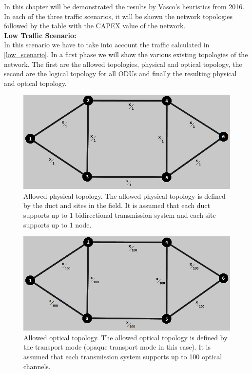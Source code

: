 In this chapter will be demonstrated the results by Vasco's heuristics from 2016. In each of the three traffic scenarios, it will be shown the network topologies followed by the table with the CAPEX value of the network.\\

\textbf{Low Traffic Scenario:}\\

In this scenario we have to take into account the traffic calculated in \ref{low_scenario}. In a first phase we will show the various existing topologies of the network. The first are the allowed topologies, physical and optical topology, the second are the logical topology for all ODUs and finally the resulting physical and optical topology.\\

\begin{figure}[H]
\centering
\includegraphics[width=13cm]{sdf/heuristic/opaque_protection/low/allowed_physical_low}
\caption{Allowed physical topology. The allowed physical topology is defined by the duct and sites in the field. It is assumed that each duct supports up to 1 bidirectional transmission system and each site supports up to 1 node.}
\label{allowed_physical_protec_ref_low_heuristic}
\end{figure}

\begin{figure}[H]
\centering
\includegraphics[width=13cm]{sdf/heuristic/opaque_protection/low/allowed_optical_low}
\caption{Allowed optical topology. The allowed optical topology is defined by the transport mode (opaque transport mode in this case). It is assumed that each transmission system supports up to 100 optical channels.}
\label{allowed_optical_protec_ref_low_heuristic}
\end{figure}

